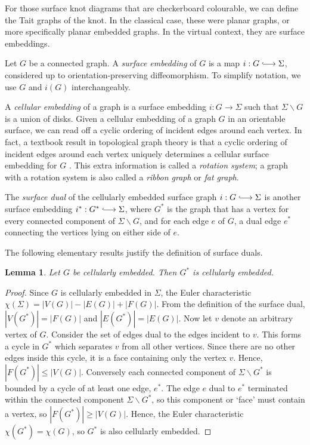 \documentclass[12pt]{report}
\newcommand{\inject}{\lhook\joinrel\longrightarrow}
\newtheorem*{lemma}{Lemma}
\theoremstyle{upright}
\begin{document}
For those surface knot diagrams that are checkerboard colourable, we can define the Tait graphs of the knot. In the classical case, these were planar graphs, or more specifically planar embedded graphs. In the virtual context, they are surface embeddings.

Let $G$ be a connected graph. A \textit{surface embedding} of $G$ is a map $i: G \inject \Sigma$, considered up to orientation-preserving diffeomorphism. To simplify notation, we use $G$ and $i(G)$ interchangeably.

A \textit{cellular embedding} of a graph is a surface embedding $i: G \longrightarrow \Sigma$ such that $\Sigma \smallsetminus G$ is a union of disks. Given a cellular embedding of a graph $G$ in an orientable surface, we can read off a cyclic ordering of incident edges around each vertex. In fact, a textbook result in topological graph theory is that a cyclic ordering of incident edges around each vertex uniquely determines a cellular surface embedding for $G$ \cite[Theorem 3.2.4]{graphs-on-surfaces}. This extra information is called a \textit{rotation system}; a graph with a rotation system is also called a \textit{ribbon graph} or \textit{fat graph}.

The \textit{surface dual} of the cellularly embedded surface graph $i: G \inject \Sigma$ is another surface embedding $i^{*}: G^{*} \inject \Sigma$, where $G^{*}$ is the graph that has a vertex for every connected component of  $\Sigma \smallsetminus G$, and for each edge $e$ of $G$, a dual edge $e^{\ast}$ connecting the vertices lying on either side of $e$.

The following elementary results justify the definition of surface duals.

\begin{lemma}
Let $G$ be cellularly embedded. Then $G^{*}$ is cellularly embedded.
\end{lemma}

\begin{proof}
Since $G$ is cellularly embedded in $\Sigma$, the Euler characteristic $\chi(\Sigma) = |V(G)| - |E(G)| + |F(G)|$. From the definition of the surface dual, $|V(G^{*})| = |F(G)|$ and $|E(G^{*})| = |E(G)|$. Now let $v$ denote an arbitrary vertex of $G$. Consider the set of edges dual to the edges incident to $v$. This forms a cycle in $G^{*}$ which separates $v$ from all other vertices. Since there are no other edges inside this cycle, it is a face containing only the vertex $v$. Hence, $|F(G^{*})| \leq |V(G)|$. Conversely each connected component of $\Sigma \smallsetminus G^{*}$ is bounded by a cycle of at least one edge, $e^{*}$. The edge $e$ dual to $e^{*}$ terminated within the connected component $\Sigma \smallsetminus G^{*}$, so this component or `face' must contain a vertex, so $|F(G^{*})| \geq |V(G)|$. Hence, the Euler characteristic $\chi(G^{*}) = \chi(G)$, so $G^{*}$ is also cellularly embedded.
\end{proof}
\end{document}

